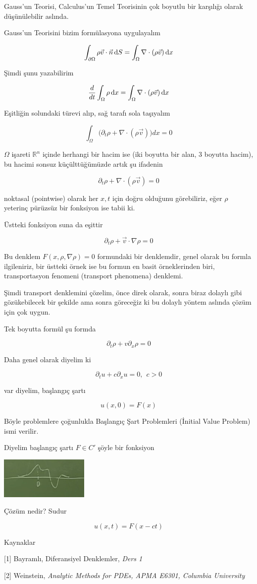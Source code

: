 \documentclass[12pt,fleqn]{article}\usepackage{../../common}
\begin{document}
Gauss'un Teorisi, Calculus'un Temel Teorisinin çok boyutlu bir karşılığı
olarak düşünülebilir aslında.

Gauss'un Teorisini bizim formülasyona uygulayalım

$$ \int_{\partial \Omega} \rho \vec{v} \cdot \vec{n} \,\mathrm{d} S =
\int_\Omega \nabla \cdot (\rho \vec{v}) \,\mathrm{d} x 
$$

Şimdi şunu yazabilirim

$$
\frac{d}{dt} \int_\Omega \rho \,\mathrm{d} x = 
\int_\Omega \nabla \cdot (\rho \vec{v}) \,\mathrm{d} x
 $$

Eşitliğin solundaki türevi alıp, sağ tarafı sola taşıyalım

$$ \int_\Omega \bigg( 
\partial_t \rho + \nabla \cdot (\rho \vec{v}) 
\bigg)dx = 0
 $$

$\Omega$ işareti $\mathbb{R}^n$ içinde herhangi bir hacim ise (iki boyutta bir
alan, 3 boyutta hacim), bu hacimi sonsuz küçülttüğümüzde artık şu ifadenin 

$$ \partial_t \rho + \nabla \cdot (\rho \vec{v})  = 0 $$

noktasal (pointwise) olarak her $x,t$ için doğru olduğunu görebiliriz, eğer
$\rho$ yeterinç pürüzsüz bir fonksiyon ise tabii ki.

Üstteki fonksiyon suna da eşittir

$$ \partial_t \rho + \vec{v} \cdot \nabla \rho = 0$$

Bu denklem $F(x,\rho,\nabla \rho)=0$ formundaki bir denklemdir, genel
olarak bu formla ilgileniriz, bir üstteki örnek ise bu formun en basit
örneklerinden biri, transportasyon fenomeni (transport phenomena) denklemi.

Şimdi transport denklemini çözelim, önce direk olarak, sonra biraz dolaylı
gibi gözükebilecek bir şekilde ama sonra göreceğiz ki bu dolaylı yöntem
aslında çözüm için çok uygun. 

Tek boyutta formül şu formda

$$ \partial_t \rho + v \partial_x \rho = 0 $$

Daha genel olarak diyelim ki 

$$ \partial_t u + c\partial_x u = 0, \ \ c>0 $$

var diyelim, başlangıç şartı

$$ u(x,0) = F(x) $$

Böyle problemlere çoğunlukla Başlangıç Şart Problemleri (İnitial Value
Problem) ismi verilir. 

Diyelim başlangıç şartı $F \in C'$  şöyle bir fonksiyon

\includegraphics[height=2cm]{4_3.png}

Çözüm nedir? Sudur 

$$ u(x,t) = F(x-ct) $$


Kaynaklar

[1] Bayramlı, Diferansiyel  Denklemler, {\em Ders 1}

[2] Weinstein, {\em Analytic Methods for PDEs, APMA E6301, Columbia University}
\end{document}
